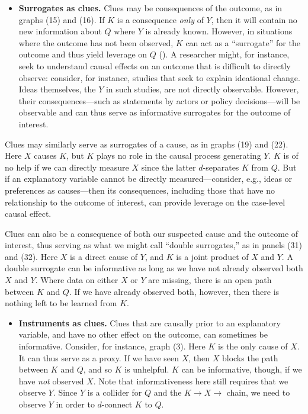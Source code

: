 \documentclass[
  12pt,
]{book}
\providecommand{\tightlist}{%
  \setlength{\itemsep}{0pt}\setlength{\parskip}{0pt}}
\begin{document}
\begin{itemize}
\tightlist
\item
  \textbf{Surrogates as clues.} Clues may be consequences of the outcome, as in graphs (15) and (16). If \(K\) is a consequence \emph{only} of \(Y\), then it will contain no new information about \(Q\) where \(Y\) is already known. However, in situations where the outcome has not been observed, \(K\) can act as a ``surrogate'' for the outcome and thus yield leverage on \(Q\) (\citet{frangakis2002principal}). A researcher might, for instance, seek to understand causal effects on an outcome that is difficult to directly observe: consider, for instance, studies that seek to explain ideational change. Ideas themselves, the \(Y\) in such studies, are not directly observable. However, their consequences---such as statements by actors or policy decisions---will be observable and can thus serve as informative surrogates for the outcome of interest.
\end{itemize}

Clues may similarly serve as surrogates of a cause, as in graphs (19) and (22). Here \(X\) causes \(K\), but \(K\) plays no role in the causal process generating \(Y\). \(K\) is of no help if we can directly measure \(X\) since the latter \(d\)-separates \(K\) from \(Q\). But if an explanatory variable cannot be directly measured---consider, e.g., ideas or preferences as causes---then its consequences, including those that have no relationship to the outcome of interest, can provide leverage on the case-level causal effect.

Clues can also be a consequence of both our suspected cause and the outcome of interest, thus serving as what we might call ``double surrogates,'' as in panels (31) and (32). Here \(X\) is a direct cause of \(Y\), and \(K\) is a joint product of \(X\) and \(Y\). A double surrogate can be informative as long as we have not already observed both \(X\) and \(Y\). Where data on either \(X\) or \(Y\) are missing, there is an open path between \(K\) and \(Q\). If we have already observed both, however, then there is nothing left to be learned from \(K\).

\begin{itemize}
\tightlist
\item
  \textbf{Instruments as clues.} Clues that are causally prior to an explanatory variable, and have no other effect on the outcome, can sometimes be informative. Consider, for instance, graph (3). Here \(K\) is the only cause of \(X\). It can thus serve as a proxy. If we have seen \(X\), then \(X\) blocks the path between \(K\) and \(Q\), and so \(K\) is unhelpful. \(K\) can be informative, though, if we have \emph{not} observed \(X\). Note that informativeness here still requires that we observe \(Y\). Since \(Y\) is a collider for \(Q\) and the \(K \rightarrow X \rightarrow\) chain, we need to observe \(Y\) in order to \(d\)-connect \(K\) to \(Q\).
\end{itemize}
\end{document}
